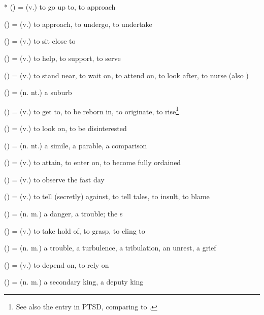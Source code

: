 \section*{}\label{upasagga:upa}
\begin{compactitem}
\item {}* () = (v.) to go up to, to approach
\item {} () = (v.) to approach, to undergo, to undertake
\item {} () = (v.) to sit close to
\item {} () = (v.) to help, to support, to serve 
\item {} () = (v.) to stand near, to wait on, to attend on, to look after, to nurse (also )
\item {} () = (n. nt.) a suburb
\item {} () = (v.) to get to, to be reborn in, to originate, to rise\footnote{See also the entry in PTSD, comparing to .}
\item {} () = (v.) to look on, to be disinterested
\item {} () = (n. nt.) a simile, a parable, a comparison 
\item {} () = (v.) to attain, to enter on, to become fully ordained
\item {} () = (v.) to observe the fast day
\item {} () = (v.) to tell (secretly) against, to tell tales, to insult, to blame
\item {} () = (n. m.) a danger, a trouble; the s 
\item {} () = (v.) to take hold of, to grasp, to cling to 
\item {} () = (n. m.) a trouble, a turbulence, a tribulation, an unrest, a grief
\item {} () = (v.) to depend on, to rely on
\item {} () = (n. m.) a secondary king, a deputy king 
\end{compactitem}

